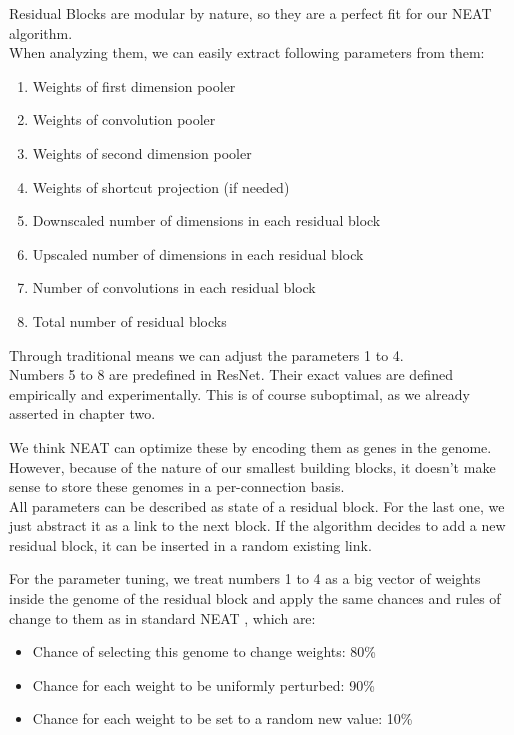 Residual Blocks are modular by nature, so they are a perfect fit for our NEAT algorithm.\\
When analyzing them, we can easily extract following parameters from them:\\
\begin{enumerate}
	\item{Weights of first dimension pooler}
	\item{Weights of convolution pooler}
	\item{Weights of second dimension pooler}
	\item{Weights of shortcut projection (if needed)}
	\item{Downscaled number of dimensions in each residual block}
	\item{Upscaled number of dimensions in each residual block}
	\item{Number of convolutions in each residual block}
	\item{Total number of residual blocks}
\end{enumerate}  
Through traditional means we can adjust the parameters 1 to 4. \\
Numbers 5 to 8 are predefined in ResNet. 
Their exact values are defined empirically and experimentally. This is of course suboptimal, as we already asserted in chapter two.

We think NEAT can optimize these by encoding them as genes in the genome. \\
However, because of the nature of our smallest building blocks, it doesn't make sense to store these genomes in a per-connection basis.\\
All parameters can be described as state of a residual block. For the last one, we just abstract it as a link to the next block. If the algorithm decides to add a new residual block, it can be inserted in a random existing link.

For the parameter tuning, we treat numbers 1 to 4 as a big vector of weights inside the genome of the residual block and apply the same chances and rules of change to them as in standard NEAT , which are:
\begin{itemize}
	\item{Chance of selecting this genome to change weights: 80\%}
	\item{Chance for each weight to be uniformly perturbed: 90\%}
	\item{Chance for each weight to be set to a random new value: 10\%}
\end{itemize}
\cite{Stanley2002}
